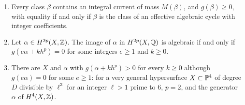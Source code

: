\begin{proposition}\label{prop:mass}
\leavevmode
\begin{enumerate}[label=\textup{(\roman*)},leftmargin=2.4em,itemsep=2pt]
\item Every class $\beta$ contains an integral current of mass $M(\beta)$, and $g(\beta)\ge0$, with equality if and only if $\beta$ is the class of an effective algebraic cycle with integer coefficients.
\item Let $\alpha\in H^{2p}(X,\mathbb{Z})$. The image of $\alpha$ in $H^{2p}(X,\mathbb{Q})$ is algebraic if and only if $g(e\alpha+kh^{p})=0$ for some integers $e\ge1$ and $k\ge0$.
\item There are $X$ and $\alpha$ with $g(\alpha+kh^{p})>0$ for every $k\ge0$ although $g(e\alpha)=0$ for some $e\ge1$: for a very general hypersurface $X\subset\mathbb{P}^{4}$ of degree $D$ divisible by $\ell^{3}$ for an integer $\ell>1$ prime to $6$, $p=2$, and the generator $\alpha$ of $H^{4}(X,\mathbb{Z})$.
\end{enumerate}
\end{proposition}

